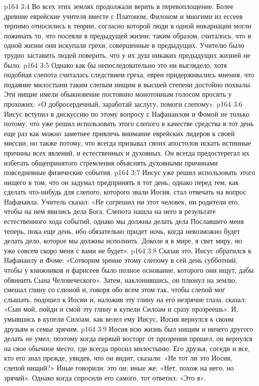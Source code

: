 \vs p164 3:4 Во всех этих землях продолжали верить в перевоплощение. Более древние еврейские учителя вместе с Платоном, Филоном и многими из ессеев терпимо относились к теории, согласно которой люди в одной инкарнации могли пожинать то, что посеяли в предыдущей жизни; таким образом, считалось, что в одной жизни они искупали грехи, совершенные в предыдущих. Учителю было трудно заставить людей поверить, что у их душ никаких предыдущих жизней не было.
\vs p164 3:5 Однако как бы непоследовательно это ни выглядело, хотя подобная слепота считалась следствием греха, евреи придерживались мнения, что подаяние милостыни таким слепым нищим в высшей степени достойно похвалы. Эти нищие имели обыкновение постоянно монотонным голосом просить у прохожих: «О добросердечный, заработай заслугу, помоги слепому».
\vs p164 3:6 \pc Иисус вступил в дискуссию по этому вопросу с Нафанаилом и Фомой не только потому, что уже решил использовать этого слепого в качестве средства в тот день еще раз как можно заметнее привлечь внимание еврейских лидеров к своей миссии, но также потому, что всегда призывал своих апостолов искать истинные причины всех явлений, и естественных и духовных. Он всегда предостерегал их избегать общепринятого стремления объяснять духовными причинами повседневные физические события.
\vs p164 3:7 Иисус уже решил использовать этого нищего в том, что он задумал предпринять в тот день, однако перед тем, как сделать что\hyp{}нибудь для слепого, которого звали Иосия, стал отвечать на вопрос Нафанаила. Учитель сказал: «Не согрешил ни этот человек, ни родители его, чтобы на нем явились дела Бога. Слепота нашла на него в результате естественного хода событий, однако мы должны делать дела Пославшего меня теперь, пока еще день, ибо обязательно придет ночь, когда невозможно будет делать дело, которое мы должны исполнить. Доколе я в мире, я свет миру, но уже совсем скоро меня с вами не будет».
\vs p164 3:8 Сказав это, Иисус обратился к Нафанаилу и Фоме: «Сотворим зрение этому слепому в сей день субботний, чтобы у книжников и фарисеев было полное основание, которого они ищут, дабы обвинить Сына Человеческого». Затем, наклонившись, он плюнул на землю, смешал глину со слюной и, говоря обо всем этом так, чтобы слепой мог слышать, подошел к Иосии и, наложив эту глину на его незрячие глаза, сказал: «Сын мой, пойди и смой эту глину в купели Силоам и сразу прозреешь». И, умывшись в купели Силоам, как велел ему Иисус, Иосия вернулся к своим друзьям и семье зрячим.
\vs p164 3:9 Иосия всю жизнь был нищим и ничего другого делать не умел; поэтому когда первый восторг от прозрения прошел, он вернулся на свое обычное место, где всегда просил милостыню. Его друзья, соседи и все, кто его знал прежде, увидев, что он видит, сказали: «Не тот ли это Иосия, слепой нищий?» Иные говорили: это он; иные же: «Нет, похож на него, но зрячий». Однако когда спросили его самого, тот ответил: «Это я».
